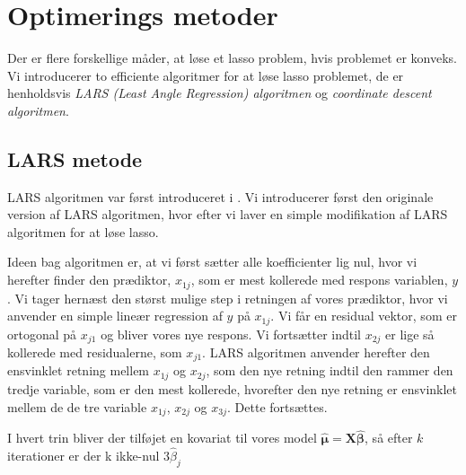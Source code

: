\chapter{Optimerings metoder}

Der er flere forskellige måder, at løse et lasso problem, hvis problemet er konveks. 
Vi introducerer to efficiente algoritmer for at løse lasso problemet, de er henholdsvis \textit{ LARS  (Least Angle Regression) algoritmen} og \textit{coordinate descent algoritmen}.

\section{LARS metode}
LARS algoritmen var først introduceret i \citep{efron}. 
Vi introducerer først den originale version af LARS algoritmen, hvor efter vi laver en simple modifikation af LARS algoritmen for at løse lasso. 

Ideen bag algoritmen er, at vi først sætter alle koefficienter lig nul, hvor vi herefter finder den prædiktor, $x_{1j}$, som er mest kollerede med respons variablen, $y$.  Vi tager hernæst den størst mulige step i retningen af vores prædiktor, hvor vi anvender en simple lineær regression af $y$ på $x_{1j}$. Vi får en residual vektor, som er ortogonal på $x_{j1}$ og bliver vores nye respons. 
Vi fortsætter indtil $x_{2j}$ er lige så kollerede med residualerne, som $x_{j1}$. 
LARS algoritmen anvender herefter den ensvinklet retning mellem $x_{1j}$ og $x_{2j}$, som den nye retning indtil den rammer den tredje variable, som er den mest kollerede, hvorefter den nye retning er ensvinklet mellem de de tre variable $x_{1j}$, $x_{2j}$ og $x_{3j}$. Dette fortsættes. 

I hvert trin bliver der tilføjet en kovariat til vores model $\widehat{\boldsymbol{\mu}} = \textbf{X} \widehat{\boldsymbol{ \beta}}$, så efter $k$ iterationer er der k ikke-nul $3\widehat{\beta}_j$ 

